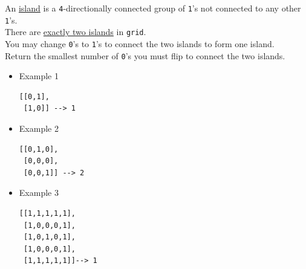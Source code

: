 An \ul{island} is a {\colorbox{CodeBackground}{\lstinline|4|}}-directionally connected group of {\colorbox{CodeBackground}{\lstinline|1|}}'s not connected to any other {\colorbox{CodeBackground}{\lstinline|1|}}'s. \\

There are \ul{exactly two islands} in {\colorbox{CodeBackground}{\lstinline|grid|}}.\\

You may change {\colorbox{CodeBackground}{\lstinline|0|}}'s to {\colorbox{CodeBackground}{\lstinline|1|}}'s to connect the two islands to form one island.\\

Return the smallest number of {\colorbox{CodeBackground}{\lstinline|0|}}'s you must flip to connect the two islands.\\

\begin{itemize}
	\item Example 1
\begin{lstlisting}
[[0,1],
 [1,0]] --> 1
\end{lstlisting}
	\item Example 2
\begin{lstlisting}
[[0,1,0],
 [0,0,0],
 [0,0,1]] --> 2
\end{lstlisting}
	\item Example 3
\begin{lstlisting}
[[1,1,1,1,1],
 [1,0,0,0,1],
 [1,0,1,0,1],
 [1,0,0,0,1],
 [1,1,1,1,1]]--> 1
\end{lstlisting}
\end{itemize}

